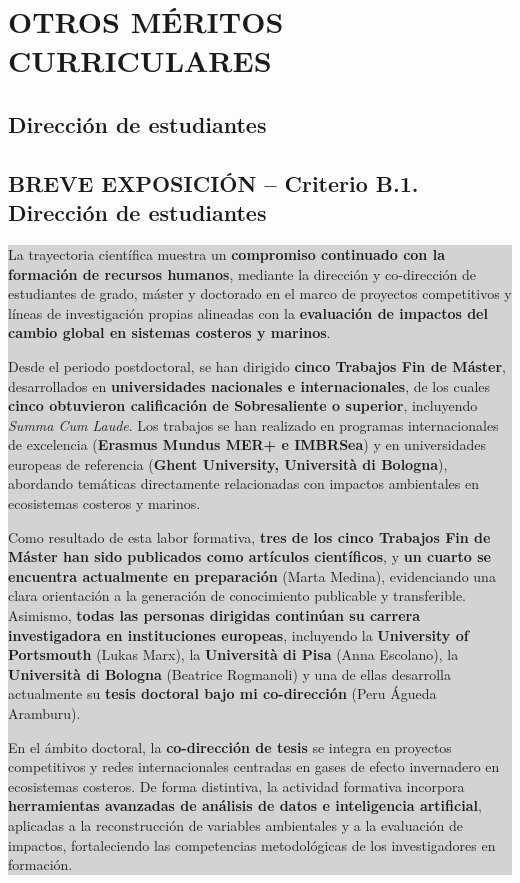 \documentclass[11pt,a4paper]{article}
\newcommand{\breveexposicion}[2]{
    \subsection*{\color{darkgray}\textbf{BREVE EXPOSICIÓN -- #1}}
    \vspace{0.3em}
    \noindent\colorbox{lightgray}{%
        \begin{minipage}{0.97\textwidth}
        \vspace{0.5em}
        \color{darkgray}
        #2
        \vspace{0.5em}
        \end{minipage}
    }
    \vspace{1em}
}
\begin{document}
\newpage


\section{OTROS MÉRITOS CURRICULARES}


\subsection{Dirección de estudiantes}

\breveexposicion{Criterio B.1. Dirección de estudiantes}{
La trayectoria científica muestra un \textbf{compromiso continuado con la formación de recursos humanos}, mediante la dirección y co-dirección de estudiantes de grado, máster y doctorado en el marco de proyectos competitivos y líneas de investigación propias alineadas con la \textbf{evaluación de impactos del cambio global en sistemas costeros y marinos}.

Desde el periodo postdoctoral, se han dirigido \textbf{cinco Trabajos Fin de Máster}, desarrollados en \textbf{universidades nacionales e internacionales}, de los cuales \textbf{cinco obtuvieron calificación de Sobresaliente o superior}, incluyendo \textit{Summa Cum Laude}. Los trabajos se han realizado en programas internacionales de excelencia (\textbf{Erasmus Mundus MER+ e IMBRSea}) y en universidades europeas de referencia (\textbf{Ghent University, Università di Bologna}), abordando temáticas directamente relacionadas con impactos ambientales en ecosistemas costeros y marinos.

Como resultado de esta labor formativa, \textbf{tres de los cinco Trabajos Fin de Máster han sido publicados como artículos científicos}, y \textbf{un cuarto se encuentra actualmente en preparación} (Marta Medina), evidenciando una clara orientación a la generación de conocimiento publicable y transferible. Asimismo, \textbf{todas las personas dirigidas continúan su carrera investigadora en instituciones europeas}, incluyendo la \textbf{University of Portsmouth} (Lukas Marx), la \textbf{Università di Pisa} (Anna Escolano), la \textbf{Università di Bologna} (Beatrice Rogmanoli) y una de ellas desarrolla actualmente su \textbf{tesis doctoral bajo mi co-dirección} (Peru Águeda Aramburu).

En el ámbito doctoral, la \textbf{co-dirección de tesis} se integra en proyectos competitivos y redes internacionales centradas en gases de efecto invernadero en ecosistemas costeros. De forma distintiva, la actividad formativa incorpora \textbf{herramientas avanzadas de análisis de datos e inteligencia artificial}, aplicadas a la reconstrucción de variables ambientales y a la evaluación de impactos, fortaleciendo las competencias metodológicas de los investigadores en formación.

}
\end{document}
